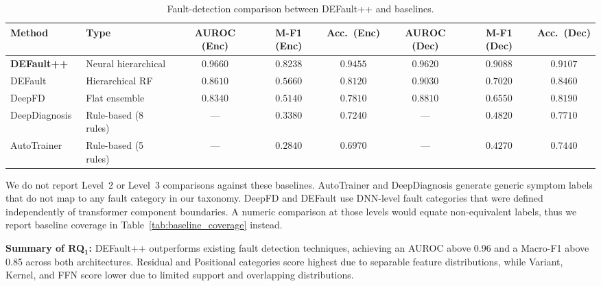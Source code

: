 \begin{table}[!htbp]
\centering
\caption{Fault-detection comparison between DEFault++ and baselines.}
\label{tab:rq1_detection_comparison}
\footnotesize
\begin{adjustbox}{max width=\textwidth}
\begin{tabular}{l l c c c c c c}
\toprule
\textbf{Method} & \textbf{Type} & \textbf{AUROC (Enc)} & \textbf{M-F1 (Enc)} & \textbf{Acc.\ (Enc)} & \textbf{AUROC (Dec)} & \textbf{M-F1 (Dec)} & \textbf{Acc.\ (Dec)} \\
\midrule
\textbf{DEFault++} & Neural hierarchical & $\mathbf{0.9660}$ & $\mathbf{0.8238}$ & $\mathbf{0.9455}$ & $\mathbf{0.9620}$ & $\mathbf{0.9088}$ & $\mathbf{0.9107}$ \\
DEFault~\cite{default} & Hierarchical RF & $0.8610$ & $0.5660$ & $0.8120$ & $0.9030$ & $0.7020$ & $0.8460$ \\
DeepFD~\cite{deepfd} & Flat ensemble & $0.8340$ & $0.5140$ & $0.7810$ & $0.8810$ & $0.6550$ & $0.8190$ \\
DeepDiagnosis~\cite{deepdiagnosis} & Rule-based (8 rules) & --- & $0.3380$ & $0.7240$ & --- & $0.4820$ & $0.7710$ \\
AutoTrainer~\cite{autotrainer} & Rule-based (5 rules) & --- & $0.2840$ & $0.6970$ & --- & $0.4270$ & $0.7440$ \\
\bottomrule
\end{tabular}
\end{adjustbox}

\smallskip
{}
\end{table}

We do not report Level~2 or Level~3 comparisons against these baselines. AutoTrainer and DeepDiagnosis generate generic symptom labels that do not map to any fault category in our taxonomy. DeepFD and DEFault use DNN-level fault categories that were defined independently of transformer component boundaries. A numeric comparison at those levels would equate non-equivalent labels, thus we report baseline coverage in Table~\ref{tab:baseline_coverage} instead.

\begin{rqsummary}
\textbf{Summary of RQ$\mathbf{_1}$:} DEFault++ outperforms existing fault detection techniques, achieving an AUROC above 0.96 and a Macro-F1 above 0.85 across both architectures. Residual and Positional categories score highest due to separable feature distributions, while Variant, Kernel, and FFN score lower due to limited support and overlapping distributions.
\end{rqsummary}

